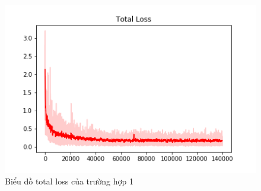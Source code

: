 \begin{center}
    \begin{figure}[H]
    \centering
    \includegraphics[width=0.9\columnwidth]{images/chap3/total_loss_2.png}
    \caption{Biểu đồ total loss của trường hợp 1}
    \label{fig:my_label}
    \end{figure}
\end{center}
